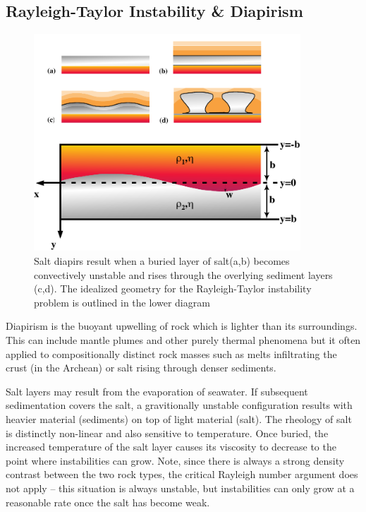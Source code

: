 \documentclass[10pt]{article}
\begin{document}
	\subsection{Rayleigh-Taylor Instability \& Diapirism}
		\begin{figure}[h]
			\begin{center}
				\includegraphics[width=100mm]{Diagrams/diapirs}
				\caption[]{
					Salt diapirs result when a buried layer of salt(a,b) becomes
					convectively unstable and rises through the overlying sediment layers (c,d).
					The idealized geometry for the Rayleigh-Taylor instability problem
					is outlined in the lower diagram}
				\label{fig:raytay}
			\end{center}	
		\end{figure}
		
	Diapirism is the buoyant upwelling of rock which is lighter
	than its surroundings. This can include mantle plumes and 
	other purely thermal phenomena but it often applied to 
	compositionally distinct rock masses such as melts infiltrating
	the crust (in the Archean) or salt rising through denser sediments.
	
	Salt layers may result from the evaporation of seawater. If subsequent
	sedimentation covers the salt, a gravitionally unstable configuration results with
	heavier material (sediments) on top of light material (salt). The rheology
	of salt is distinctly non-linear and also sensitive to temperature. Once buried, the 
	increased temperature of the salt layer causes its viscosity to decrease to the 
	point where instabilities can grow. Note, since there is always a strong density 
	contrast between the two rock types, the critical Rayleigh number argument
	does not apply -- this situation is always unstable, but instabilities can only
	grow at a reasonable rate once the salt has become weak.
	
\end{document}
